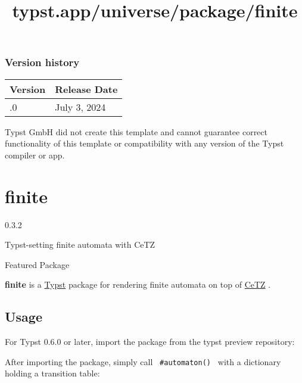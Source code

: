 \label{versions}
\subsubsection{Version history}\label{version-history}

\begin{longtable}[]{@{}ll@{}}
\toprule\noalign{}
Version & Release Date \\
\midrule\noalign{}
\endhead
\bottomrule\noalign{}
\endlastfoot
0.1.0 & July 3, 2024 \\
\end{longtable}

Typst GmbH did not create this template and cannot guarantee correct
functionality of this template or compatibility with any version of the
Typst compiler or app.


\title{typst.app/universe/package/finite}

\label{banner}
\section{finite}\label{finite}

{ 0.3.2 }

Typst-setting finite automata with CeTZ

{ } Featured Package

\label{readme}
\textbf{finite} is a \href{https://github.com/typst/typst}{Typst}
package for rendering finite automata on top of
\href{https://github.com/johannes-wolf/typst-canvas}{CeTZ} .

\subsection{Usage}\label{usage}

For Typst 0.6.0 or later, import the package from the typst preview
repository:

\begin{Shaded}
\begin{Highlighting}[]
\OperatorTok{:}
\end{Highlighting}
\end{Shaded}

After importing the package, simply call \texttt{\ \#automaton()\ } with
a dictionary holding a transition table:

